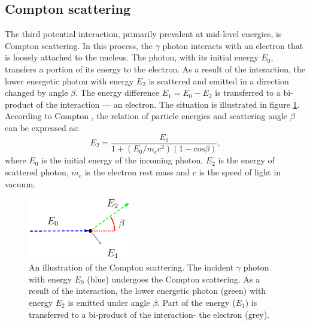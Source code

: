 \subsection{Compton scattering}
The third potential interaction, primarily prevalent at mid-level energies, is Compton scattering.
In this process, the $\gamma$ photon interacts with an electron that is loosely attached to the nucleus. 
The photon, with its initial energy $E_{0}$, transfers a portion of its energy to the electron.
As a result of the interaction, the lower energetic photon with energy $E_{2}$ is scattered and emitted in a direction changed by angle $\beta$. 
The energy difference $E_{1} = E_{0} - E_{2}$ is transferred to a bi-product of the interaction --- an electron.
The situation is illustrated in figure \ref{fig:scattering}.
According to Compton \cite{compton}, the relation of particle energies and scattering angle $\beta$ can be expressed as:
\begin{equation}
E_{2} = \frac{E_{0}}{  1 + (E_{0} / m_{e}c^{2}) (1 - \mathrm{cos} \beta)},
  \label{eq:compton_energies}
\end{equation}
where $E_{0}$ is the initial energy of the incoming photon, $E_{2}$ is the energy of scattered photon,  $m_{e}$ is the electron rest mass and $c$ is the speed of light in vacuum. 
\begin{figure}[!h]
    \centering
    \includegraphics[width=0.4\textwidth]{./fig/photos/compton_simple2.eps}
    \caption{An illustration of the Compton scattering. The incident $\gamma$ photon with energy $E_{0}$ (blue) undergoes the Compton scattering. As a result of the interaction, the lower energetic photon (green) with energy $E_{2}$ is emitted under angle $\beta$. Part of the energy ($E_{1}$) is transferred to a bi-product of the interaction- the electron (grey).}
    \label{fig:scattering}
\end{figure}

\mycomment{ %
  The probability that a photon with an energy $E_{0}$ undergoes a Compton scattering through an angle $\beta$ is described by the Klein-Nishina formula
  \begin{equation}
    K(\beta, E_{0}) = \frac{r_{e}^{2}}{2} \left( \frac{E_{2}}{E_{0}}  \right)^{2} \left(  \frac{E_{2}}{E_{0}} + \frac{E_{0}}{E_{2}} - \mathrm{sin}^{2}(\beta)  \right),
    \label{eq:klein_nishina}
  \end{equation}
  where $r_{e}$ is the classical electron radius. 
}%

